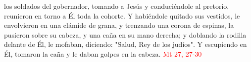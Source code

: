 los soldados del gobernador, tomando a Jesús y conduciéndole al pretorio, reunieron en torno a Él toda la cohorte. 
Y habiéndole quitado sus vestidos, le envolvieron en una clámide de grana, y trenzando una corona de espinas, la pusieron sobre su cabeza, 
y una caña en su mano derecha; y doblando la rodilla delante de Él, le mofaban, diciendo: "Salud, Rey de los judíos". Y escupiendo en Él, 
tomaron la caña y le daban golpes en la cabeza. \textcolor{red}{Mt 27, 27-30}